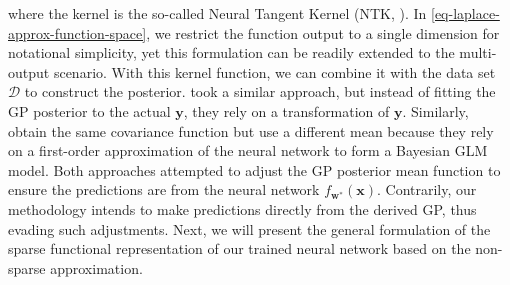 \documentclass{article}
\newcommand{\dataset}{\ensuremath{\mathcal{D}}}
\newcommand{\mbf}[1]{\mathbf{#1}}
\newcommand{\vx}{\mbf{x}}
\newcommand{\vy}{\mbf{y}}
\newcommand{\vw}{\mbf{w}}
\begin{document}
where the kernel is the so-called Neural Tangent Kernel (NTK, \cite{jacot2018neural}). In \cref{eq-laplace-approx-function-space}, we restrict the function output to a single dimension for notational simplicity, yet this formulation can be readily extended to the multi-output scenario. With this kernel function, we can combine it with the data set $\dataset$ to construct the posterior. 
%
\citet{khan2019approximate} took a similar approach, but instead of fitting the GP posterior to the actual $\vy$, they rely on a transformation of $\vy$. Similarly, \citet{immer2021improving} obtain the same covariance function but use a different mean because they rely on a first-order approximation of the neural network to form a Bayesian GLM model. Both approaches attempted to adjust the GP posterior mean function to ensure the predictions are from the neural network $f_{\vw^*}(\vx)$. 
Contrarily, our methodology intends to make predictions directly from the derived GP, thus evading such adjustments. Next, we will present the general formulation of the sparse functional representation of our trained neural network based on the non-sparse approximation. 
\end{document}
